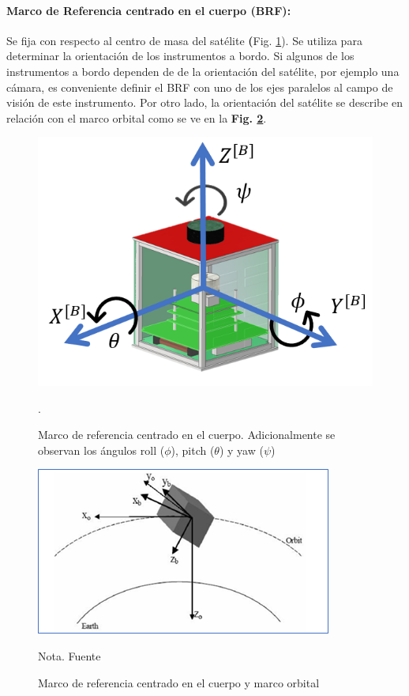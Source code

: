 \paragraph{Marco de Referencia centrado en el cuerpo (BRF):}Se fija con respecto al centro de masa del satélite \textbf({Fig. \ref{fig:marco_cuerpo}}). Se utiliza para determinar la orientación de los instrumentos a bordo. Si algunos de los instrumentos a bordo dependen de de la orientación del satélite, por ejemplo una cámara, es conveniente definir el BRF con uno de los ejes paralelos al campo de visión de este instrumento. Por otro lado, la orientación del satélite se describe en relación con el marco orbital como se ve en la \textbf{Fig. \ref{fig:marco_orbital_cuerpo}}.


\begin{figure}[!ht]
	\begin{center}
		\includegraphics[scale=0.7]{imagenes/marco_teorico/marco_cuerpo.PNG}\\
	\end{center}
	\caption{ Marco de referencia centrado en el cuerpo. Adicionalmente se observan los ángulos roll ($\phi$), pitch ($\theta$) y yaw ($\psi$)}.
	\label{fig:marco_cuerpo}
\end{figure}

\begin{figure}[!ht]
	\begin{center}
		\includegraphics[scale=0.9]{imagenes/marco_teorico/orbital_cuerpo.PNG}\\
	\end{center}
	\caption{ Marco de referencia centrado en el cuerpo y marco orbital}
	\label{fig:marco_orbital_cuerpo}
		\footnotesize{Nota. Fuente \cite{Karatas2006}}
\end{figure}

